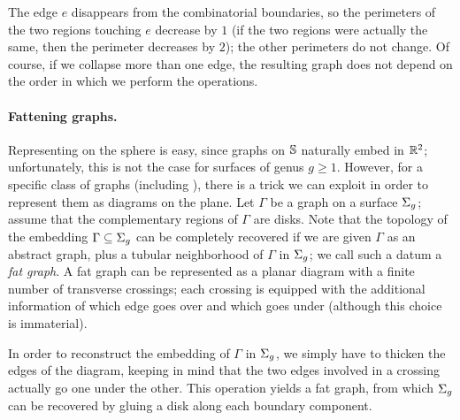 The edge $e$ disappears from the combinatorial boundaries, so the perimeters of the two regions touching $e$ decrease by $1$ (if the two regions were actually the same, then the perimeter decreases by $2$); the other perimeters do not change. Of course, if we collapse more than one edge, the resulting graph does not depend on the order in which we perform the operations.

\paragraph{Fattening graphs.} Representing \dessins{} on the sphere is easy, since graphs on $\mathbb{S}{}$ naturally embed in $\mathbb{R}^2$; unfortunately, this is not the case for surfaces of genus $g\ge 1$. However, for a specific class of graphs (including \dessins{}), there is a trick we can exploit in order to represent them as diagrams on the plane. Let $\Gamma$ be a graph on a surface $\Sigma_{g}$; assume that the complementary regions of $\Gamma$ are disks. Note that the topology of the embedding $\Gamma\subseteq\Sigma_{g}$ can be completely recovered if we are given $\Gamma$ as an abstract graph, plus a tubular neighborhood of $\Gamma$ in $\Sigma_{g}$; we call such a datum a \emph{fat graph}. A fat graph can be represented as a planar diagram with a finite number of transverse crossings; each crossing is equipped with the additional information of which edge goes over and which goes under (although this choice is immaterial).

In order to reconstruct the embedding of $\Gamma$ in $\Sigma_{g}$, we simply have to thicken the edges of the diagram, keeping in mind that the two edges involved in a crossing actually go one under the other. This operation yields a fat graph, from which $\Sigma_{g}$ can be recovered by gluing a disk along each boundary component.

